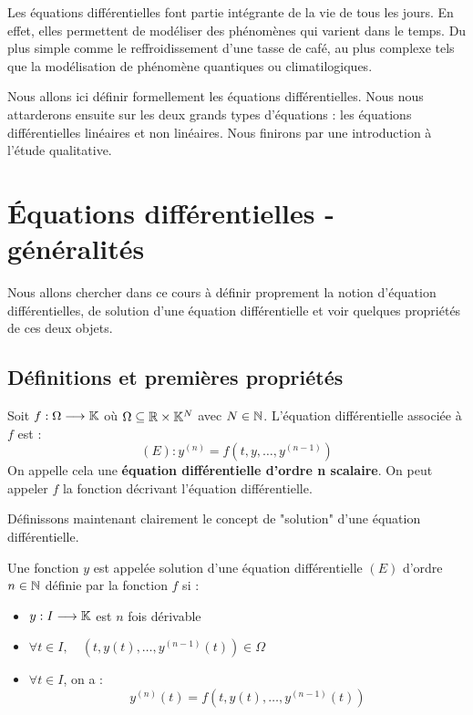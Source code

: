 
\minitoc  %

Les équations différentielles font partie intégrante de la vie de tous les jours. 
En effet, elles permettent de modéliser des phénomènes qui varient dans le temps. 
Du plus simple comme le reffroidissement d'une tasse de café, au plus complexe tels que la modélisation 
de phénomène quantiques ou climatilogiques. 

Nous allons ici définir formellement les équations différentielles. Nous nous attarderons ensuite sur 
les deux grands types d'équations : les équations différentielles linéaires et non linéaires. 
Nous finirons par une introduction à l'étude qualitative. 


\section{Équations différentielles - généralités}

Nous allons chercher dans ce cours à définir proprement la notion d'équation différentielles, 
de solution d'une équation différentielle et voir quelques propriétés de ces deux objets. 

\subsection{Définitions et premières propriétés}

\begin{definition}
    Soit $f : \Omega \longrightarrow \mathbb{K}$ où $ \Omega \subseteq \mathbb{R} \times \mathbb{K}^N$ avec $N \in \mathbb{N}$. 
    L'équation différentielle associée à $f$ est :
        \[ (E) : y^{(n)} = f(t,y,\dots,y^{(n-1)}) \] 
    On appelle cela une \textbf{équation différentielle d'ordre n scalaire}. 
    On peut appeler $f$ la fonction décrivant l'équation différentielle. 
\end{definition}

Définissons maintenant clairement le concept de "solution" d'une équation différentielle. 

\begin{definition}[Solution]
    Une fonction $y$ est appelée solution d'une équation différentielle $(E)$ d'ordre $n \in \mathbb{N}$ 
    définie par la fonction $f$ si :
    \begin{itemize}
        \item $y : I \longrightarrow \mathbb{K}$ est $n$ fois dérivable 
        \item $ \forall t \in I, \quad (t,y(t), \dots, y^{(n-1)}(t)) \in \Omega $ 
        \item $ \forall t \in I$, on a : 
            \[ \boxed{ y^{(n)}(t) = f(t,y(t), \dots, y^{(n-1)}(t)) } \] 
    \end{itemize}
\end{definition}

